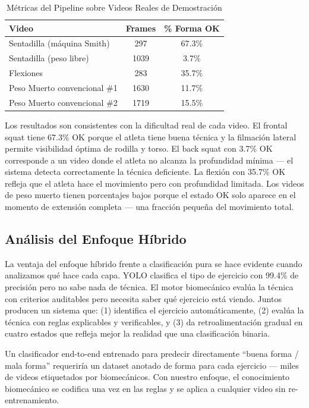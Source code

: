 \documentclass[conference]{IEEEtran}
\begin{document}
\begin{table}[h]
\caption{Métricas del Pipeline sobre Videos Reales de Demostración}
\centering
\begin{tabular}{|l|c|c|}
\hline
\textbf{Video} & \textbf{Frames} & \textbf{\% Forma OK} \\
\hline
Sentadilla (máquina Smith) & 297  & 67.3\% \\
Sentadilla (peso libre)    & 1039 & 3.7\%  \\
Flexiones                  & 283  & 35.7\% \\
Peso Muerto convencional \#1 & 1630 & 11.7\% \\
Peso Muerto convencional \#2 & 1719 & 15.5\% \\
\hline
\end{tabular}
\label{tab:pipeline}
\end{table}

Los resultados son consistentes con la dificultad real de cada video. El frontal squat tiene 67.3\% OK porque el atleta tiene buena técnica y la filmación lateral permite visibilidad óptima de rodilla y torso. El back squat con 3.7\% OK corresponde a un video donde el atleta no alcanza la profundidad mínima — el sistema detecta correctamente la técnica deficiente. La flexión con 35.7\% OK refleja que el atleta hace el movimiento pero con profundidad limitada. Los videos de peso muerto tienen porcentajes bajos porque el estado OK solo aparece en el momento de extensión completa — una fracción pequeña del movimiento total.

\subsection{Análisis del Enfoque Híbrido}

La ventaja del enfoque híbrido frente a clasificación pura se hace evidente cuando analizamos qué hace cada capa. YOLO clasifica el tipo de ejercicio con 99.4\% de precisión pero no sabe nada de técnica. El motor biomecánico evalúa la técnica con criterios auditables pero necesita saber qué ejercicio está viendo. Juntos producen un sistema que: (1) identifica el ejercicio automáticamente, (2) evalúa la técnica con reglas explicables y verificables, y (3) da retroalimentación gradual en cuatro estados que refleja mejor la realidad que una clasificación binaria.

Un clasificador end-to-end entrenado para predecir directamente ``buena forma / mala forma'' requeriría un dataset anotado de forma para cada ejercicio — miles de videos etiquetados por biomecánicos. Con nuestro enfoque, el conocimiento biomecánico se codifica una vez en las reglas y se aplica a cualquier video sin re-entrenamiento.
\end{document}
